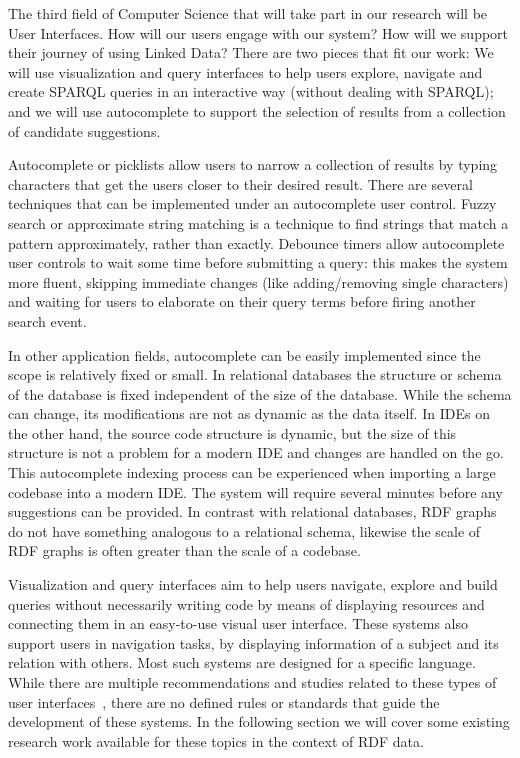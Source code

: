 The third field of Computer Science that will take part in our research will be User Interfaces. How will our users engage with our system? How will we support their journey of using Linked Data? There are two pieces that fit our work: We will use visualization and query interfaces to help users explore, navigate and create SPARQL queries in an interactive way (without dealing with SPARQL); and we will use autocomplete to support the selection of results from a collection of candidate suggestions. 

Autocomplete or picklists allow users to narrow a collection of results by typing characters that get the users closer to their desired result. There are several techniques that can be implemented under an autocomplete user control. Fuzzy search or approximate string matching is a technique to find strings that match a pattern approximately, rather than exactly. Debounce timers allow autocomplete user controls to wait some time before submitting a query: this makes the system more fluent, skipping immediate changes (like adding/removing single characters) and waiting for users to elaborate on their query terms before firing another search event.

In other application fields, autocomplete can be easily implemented since the scope is relatively fixed or small. In relational databases the structure or schema of the database is fixed independent of the size of the database. While the schema can change, its modifications are not as dynamic as the data itself. In IDEs on the other hand, the source code structure is dynamic, but the size of this structure is not a problem for a modern IDE and changes are handled on the go. This autocomplete indexing process can be experienced when importing a large codebase into a modern IDE. The system will require several minutes before any suggestions can be provided. In contrast with relational databases, RDF graphs do not have something analogous to a relational schema, likewise the scale of RDF graphs is often greater than the scale of a codebase.

Visualization and query interfaces aim to help users navigate, explore and build queries without necessarily writing code by means of displaying resources and connecting them in an easy-to-use visual user interface. These systems also support users in navigation tasks, by displaying information of a subject and its relation with others. Most such systems are designed for a specific language. While there are multiple recommendations and studies related to these types of user interfaces~\cite{Dadzie2011, Bikakis2016}, there are no defined rules or standards that guide the development of these systems. In the following section we will cover some existing research work available for these topics in the context of RDF data.

